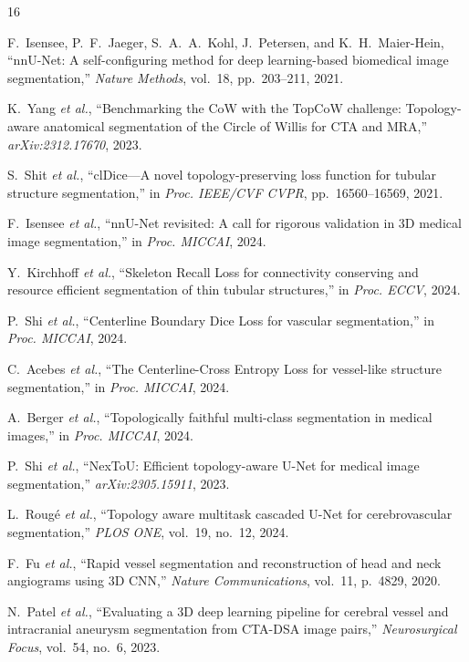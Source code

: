 \documentclass[conference]{IEEEtran}
\begin{document}
\begin{thebibliography}{16}

F.~Isensee, P.~F.~Jaeger, S.~A.~A.~Kohl, J.~Petersen, and K.~H.~Maier-Hein,
``nnU-Net: A self-configuring method for deep learning-based biomedical image segmentation,''
\textit{Nature Methods}, vol.~18, pp.~203--211, 2021.

K.~Yang \textit{et al.},
``Benchmarking the CoW with the TopCoW challenge: Topology-aware anatomical segmentation of the Circle of Willis for CTA and MRA,''
\textit{arXiv:2312.17670}, 2023.

S.~Shit \textit{et al.},
``clDice---A novel topology-preserving loss function for tubular structure segmentation,''
in \textit{Proc. IEEE/CVF CVPR}, pp.~16560--16569, 2021.

F.~Isensee \textit{et al.},
``nnU-Net revisited: A call for rigorous validation in 3D medical image segmentation,''
in \textit{Proc. MICCAI}, 2024.

Y.~Kirchhoff \textit{et al.},
``Skeleton Recall Loss for connectivity conserving and resource efficient segmentation of thin tubular structures,''
in \textit{Proc. ECCV}, 2024.

P.~Shi \textit{et al.},
``Centerline Boundary Dice Loss for vascular segmentation,''
in \textit{Proc. MICCAI}, 2024.

C.~Acebes \textit{et al.},
``The Centerline-Cross Entropy Loss for vessel-like structure segmentation,''
in \textit{Proc. MICCAI}, 2024.

A.~Berger \textit{et al.},
``Topologically faithful multi-class segmentation in medical images,''
in \textit{Proc. MICCAI}, 2024.

P.~Shi \textit{et al.},
``NexToU: Efficient topology-aware U-Net for medical image segmentation,''
\textit{arXiv:2305.15911}, 2023.

L.~Roug\'{e} \textit{et al.},
``Topology aware multitask cascaded U-Net for cerebrovascular segmentation,''
\textit{PLOS ONE}, vol.~19, no.~12, 2024.

F.~Fu \textit{et al.},
``Rapid vessel segmentation and reconstruction of head and neck angiograms using 3D CNN,''
\textit{Nature Communications}, vol.~11, p.~4829, 2020.

N.~Patel \textit{et al.},
``Evaluating a 3D deep learning pipeline for cerebral vessel and intracranial aneurysm segmentation from CTA-DSA image pairs,''
\textit{Neurosurgical Focus}, vol.~54, no.~6, 2023.


\end{thebibliography}
\end{document}
